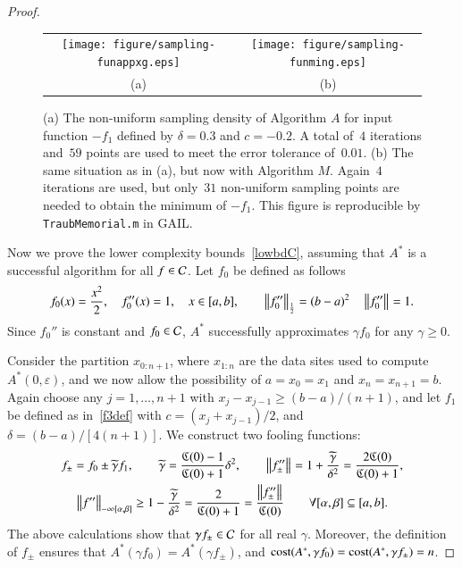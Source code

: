 \documentclass[review]{elsarticle}
\newcommand{\abstol}{\varepsilon}
\theoremstyle{definition}
\newcommand{\tgamma}{\widetilde{\gamma}}
\begin{document}
\begin{proof}
\begin{figure}[t]
\begin{tabular}{cc}	
		 \texttt{[image: figure/sampling-funappxg.eps]}
		&\texttt{[image: figure/sampling-funming.eps]}
		\\ (a) & (b)
		\end{tabular}
		\caption{(a) The non-uniform sampling density of Algorithm $A$ for input function
$-f_1$ defined by $\delta = 0.3$ and $c = -0.2$. A total of~$4$ iterations
and~$59$ points are used to meet the error tolerance of~$0.01$. 
(b) The same situation as in (a), but now
with Algorithm $M$. Again~$4$ iterations are used, but only~$31$ non-uniform
sampling points are needed to obtain the minimum of $-f_1$.  
This figure is reproducible by \texttt{TraubMemorial.m}
		in GAIL.}
		\label{f3foolplot}
\end{figure}
  
	Now we prove the lower complexity bounds~\eqref{lowbdC}, assuming that $A^*$ is
	a successful algorithm for all $f \in \mathcal{C}$. Let $f_0$ be defined as follows
	\begin{equation}
	\label{assumpfzero}
	f_0(x) =\frac{x^2}{2}, \quad f_0''(x) = 1, \quad x \in [a,b], \qquad \norm[\frac12]{f_0''} 
	= (b -a)^2  \quad \norm{f_0''} = 1.
	\end{equation}
	Since $f_0''$ is constant and $f_0 \in \mathcal{C}$,  $A^*$ successfully approximates
	$\gamma f_0$ for any  $\gamma\ge0$.
	
	Consider the partition $x_{0:n+1}$, where $x_{1:n}$ are the data sites
	used to compute $A^*(0,\abstol)$, and we now allow the possibility of $a = x_0=x_1$ 
	and $x_n = x_{n+1} = b$.  Again choose any $j=1, \ldots, n+1$ with $x_j-x_{j-1}
	\ge (b-a)/(n+1)$, and let $f_1$ be defined as in~\eqref{f3def} with $c =
	(x_j+x_{j-1})/2$, and $\delta = (b-a)/[4(n+1)]$. We construct two fooling
	functions:
	\begin{gather*}
	f_{\pm} = f_0 \pm \tgamma f_1, \qquad \tgamma =\frac{\fC(0)-1}{\fC(0)+1}\delta^2, 
	\qquad
	\norm{f''_{\pm}} = 1+\frac{\tgamma}{\delta^2} = \frac{2\fC(0)}{\fC(0)+1} , \\
\norm[-\infty{[\alpha,\beta]}]{f''} \ge 1-\frac{\tgamma}{\delta^2} = \frac{2}{\fC(0)+1} 
= \frac{\norm{f''_{\pm}} }{\fC(0)} \qquad \forall [\alpha,\beta] \subseteq [a,b].
	\end{gather*}
	The above calculations show that $\gamma f_{\pm} \in \mathcal{C}$ for all real
	$\gamma$. Moreover, the definition of $f_{\pm}$ ensures that $A^*(\gamma f_0) =
	A^*(\gamma f_{\pm})$, and $\operatorname{cost}(A^*,\gamma f_0) = \operatorname{cost}(A^*,\gamma f_{\pm}) =
	n$.
	

\end{proof}
\end{document}
